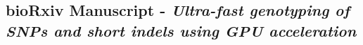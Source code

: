 \begin{appendices}

\section{bioRxiv Manuscript - \textit{Ultra-fast genotyping of SNPs and short indels using GPU acceleration}}
\label{appendix:manuscript}


\end{appendices}
